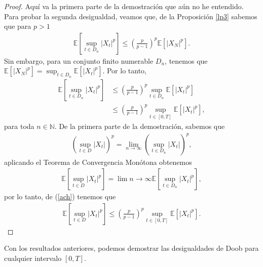 \begin{proof}
	Aquí va la primera parte de la demostración que aún no he entendido. \\
    
    Para probar la segunda desigualdad, veamos que, de la Proposición \ref{lp3} sabemos que para $p > 1$
    \begin{align*}
		\mathbb{E} \left[ \sup_{t \in D_n} |X_t|^p \right] \leq \left( \frac{p}{p-1} \right)^p \mathbb{E} [|X_N|^p].
	\end{align*}
Sin embargo, para un conjunto finito numerable $D_n$, tenemos que $\mathbb{E} [|X_N|^p] = \sup_{t \in D_n} \mathbb{E}[|X_t|^p]$. Por lo tanto,
	\begin{align}
	\mathbb{E} \left[ \sup_{t \in D_n} |X_t|^p \right] & \leq \left( \frac{p}{p-1} \right)^p \sup_{t \in D_n} \mathbb{E}[|X_t|^p] \nonumber \\
    & \leq \left( \frac{p}{p-1} \right)^p \sup_{t \in [0, T]} \mathbb{E}[|X_t|^p], \label{ach}
	\end{align}
para toda $n \in \mathbb{N}$. De la primera parte de la demostración, sabemos que
	\begin{align*}
		\left( \sup_{t \in D} |X_t| \right)^p = \lim_{n \rightarrow \infty} \left( \sup_{t \in D_n} |X_t| \right)^p,
	\end{align*}
aplicando el Teorema de Convergencia Monótona obtenemos
	\begin{align*}
		\mathbb{E} \left[ \sup_{t \in D} |X_t|^p \right] = \lim{n \rightarrow \infty} \mathbb{E} \left[ \sup_{t \in D_n} |X_t|^p \right],
	\end{align*}
por lo tanto, de (\ref{ach}) tenemos que
	\begin{align*}
		\mathbb{E} \left[ \sup_{t \in D} |X_t|^p \right] \leq \left( \frac{p}{p-1} \right)^p \sup_{t \in [0, T]} \mathbb{E}[|X_t|^p].
	\end{align*}
\end{proof}

Con los resultados anteriores, podemos demostrar las desigualdades de Doob para cualquier intervalo $[0, T]$.

